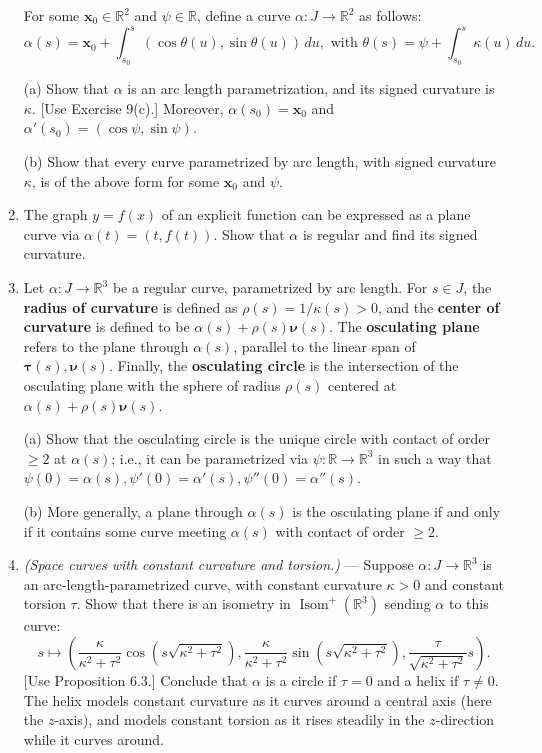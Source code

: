 \documentclass[leqno]{book}
\begin{document}
\begin{enumerate}
For some $\mathbf x_0\in\mathbb R^2$ and $\psi\in\mathbb R$, define a curve $\alpha:J\to\mathbb R^2$ as follows:
$$\alpha(s)=\mathbf x_0+\int_{s_0}^s(\cos\theta(u),\sin\theta(u))\,du,\text{ with }\theta(s)=\psi+\int_{s_0}^s\kappa(u)\,du.$$

(a) Show that $\alpha$ is an arc length parametrization, and its signed curvature is $\kappa$.  [Use Exercise 9(c).]  Moreover, $\alpha(s_0)=\mathbf x_0$ and $\alpha'(s_0)=(\cos\psi,\sin\psi)$.

(b) Show that every curve parametrized by arc length, with signed curvature $\kappa$, is of the above form for some $\mathbf x_0$ and $\psi$.

\item The graph $y=f(x)$ of an explicit function can be expressed as a plane curve via $\alpha(t)=(t,f(t))$.  Show that $\alpha$ is regular and find its signed curvature.

\item Let $\alpha:J\to\mathbb R^3$ be a regular curve, parametrized by arc length.  For $s\in J$, the \textbf{radius of curvature} is defined as $\rho(s)=1/\kappa(s)>0$, and the \textbf{center of curvature} is defined to be $\alpha(s)+\rho(s)\boldsymbol\nu(s)$.  The \textbf{osculating plane} refers to the plane through $\alpha(s)$, parallel to the linear span of $\boldsymbol\tau(s),\boldsymbol\nu(s)$.  Finally, the \textbf{osculating circle} is the intersection of the osculating plane with the sphere of radius $\rho(s)$ centered at $\alpha(s)+\rho(s)\boldsymbol\nu(s)$.

(a) Show that the osculating circle is the unique circle with contact of order $\geqslant 2$ at $\alpha(s)$; i.e., it can be parametrized via $\psi:\mathbb R\to\mathbb R^3$ in such a way that $\psi(0)=\alpha(s),\psi'(0)=\alpha'(s),\psi''(0)=\alpha''(s)$.

(b) More generally, a plane through $\alpha(s)$ is the osculating plane if and only if it contains some curve meeting $\alpha(s)$ with contact of order $\geqslant 2$.

\item\emph{(Space curves with constant curvature and torsion.)} \---- Suppose $\alpha:J\to\mathbb R^3$ is an arc-length-parametrized curve, with constant curvature $\kappa>0$ and constant torsion $\tau$.  Show that there is an isometry in $\operatorname{Isom}^+(\mathbb R^3)$ sending $\alpha$ to this curve:
$$s\mapsto\left(\frac{\kappa}{\kappa^2+\tau^2}\cos(s\sqrt{\kappa^2+\tau^2}),\frac{\kappa}{\kappa^2+\tau^2}\sin(s\sqrt{\kappa^2+\tau^2}),\frac{\tau}{\sqrt{\kappa^2+\tau^2}}s\right).$$
[Use Proposition 6.3.]  Conclude that $\alpha$ is a circle if $\tau=0$ and a helix if $\tau\ne 0$.  The helix models constant curvature as it curves around a central axis (here the $z$-axis), and models constant torsion as it rises steadily in the $z$-direction while it curves around.


\end{enumerate}
\end{document}

